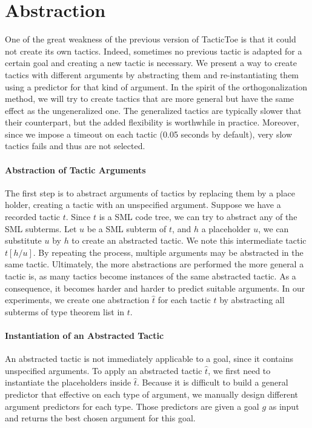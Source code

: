 \documentclass[runningheads,a4paper,draft]{svjour3}
\def\sml{\textsf{SML}\xspace}
\def\tactictoe{\textsf{TacticToe}\xspace}
\begin{document}
\section{Abstraction}\label{sec:synthesis}
One of the great weakness of the previous version of \tactictoe is that
it could not create its own tactics. Indeed, sometimes no previous tactic is
adapted for a certain goal and creating a new tactic is necessary.
We present a way to create tactics with different arguments
by abstracting them and re-instantiating them using a predictor for that kind
of argument. In the spirit of the orthogonalization method, we will try to
create tactics that are more general but have the same effect as the
ungeneralized one. The generalized tactics are typically slower that their 
counterpart, but the added flexibility is worthwhile in practice. Moreover, 
since we impose a timeout on each tactic (0.05 seconds by default), very slow 
tactics fails and thus are not selected.

\paragraph{Abstraction of Tactic Arguments}
The first step is to abstract arguments of tactics by replacing them by a
place holder, creating a tactic with an unspecified argument.
Suppose we have a recorded tactic $t$. Since $t$ is a \sml code tree, we can
try to abstract any of the
\sml subterms. Let $u$ be a \sml subterm of $t$, and $h$ a placeholder $u$, we
can substitute $u$ by $h$ to create an abstracted tactic.
We note this intermediate tactic $t[h/u]$. By repeating the
process, multiple
arguments may be abstracted in the same tactic. Ultimately, the more
abstractions are performed the more general a tactic is, as many tactics
become instances of the same abstracted tactic. As a consequence, it becomes 
harder and harder to predict suitable arguments. In our experiments, we create 
one abstraction $\hat{t}$ for each tactic $t$ by abstracting all subterms of 
type theorem list in $t$.

\paragraph{Instantiation of an Abstracted Tactic}
An abstracted tactic is not immediately applicable to a goal, since it contains
unspecified arguments. To apply an abstracted tactic $\hat{t}$, we first need
to
instantiate the placeholders inside $\hat{t}$. Because it is difficult to
build a general predictor that effective on each type of argument, we manually
design different argument predictors for each type. Those predictors are
given a goal $g$ as input and returns the best chosen argument for this
goal.
\end{document}
